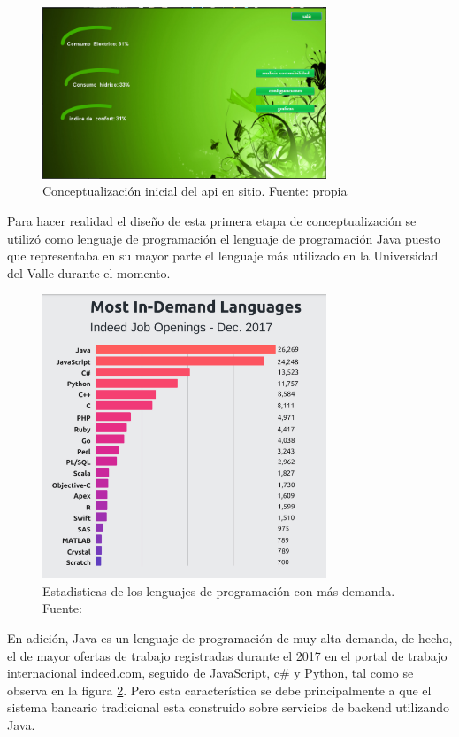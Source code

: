 \begin{figure}[htbp]
	\centerline{\includegraphics[width=8.5cm]{figuras/houseManager1.png}}
	\caption{Conceptualización inicial del api en sitio. Fuente: propia}
	\label{fig_0}
\end{figure}

Para hacer realidad el diseño de esta primera etapa de conceptualización se utilizó como lenguaje de programación el lenguaje de programación Java puesto que representaba en su mayor parte el lenguaje más utilizado en la Universidad del Valle durante el momento.

\begin{figure}[htbp]
	\centerline{\includegraphics[width=8.5cm]{./figuras/stadistics_job.png}}
	\caption{Estadisticas de los lenguajes de programación con más demanda. Fuente: \cite{stackoverflow2017}}
	\label{fig_1}
\end{figure}

En adición, Java es un lenguaje de programación de muy alta demanda, de hecho, el de mayor ofertas de trabajo registradas durante el 2017 en el portal de trabajo internacional \href{https://co.indeed.com/?r=us}{indeed.com}, seguido de JavaScript, c\# y Python, tal como se observa en la figura \ref{fig_1}. Pero esta característica se debe principalmente a que el sistema bancario tradicional esta construido sobre servicios de backend utilizando Java.

